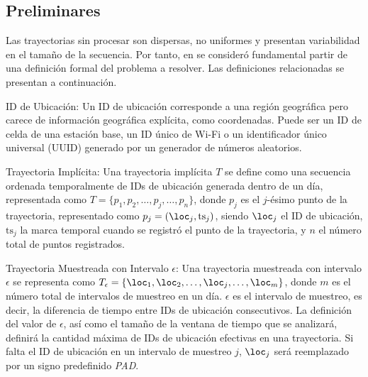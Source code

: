 \subsection{Preliminares}

Las trayectorias sin procesar son dispersas, no uniformes y presentan variabilidad en el tamaño de la secuencia. Por tanto, en \cite{si2023trajbert} se consideró fundamental partir de una definición formal del problema a resolver. Las definiciones relacionadas se presentan a continuación.

\begin{definition}{ID de Ubicación:}
    Un ID de ubicación corresponde a una región geográfica pero carece de información geográfica explícita, como coordenadas. Puede ser un ID de celda de una estación base, un ID único de Wi-Fi o un identificador único universal (UUID) generado por un generador de números aleatorios.
\end{definition}

\begin{definition}{Trayectoria Implícita:}
    Una trayectoria implícita $T$ se define como una secuencia ordenada temporalmente de IDs de ubicación generada dentro de un día, representada como $T = \{p_1, p_2, \ldots, p_j, \ldots, p_n\}$, donde $p_j$ es el $j$-ésimo punto de la trayectoria, representado como $p_j = (\loc_j, \text{ts}_j)$, siendo $\loc_j$ el ID de ubicación, $\text{ts}_j$ la marca temporal cuando se registró el punto de la trayectoria, y $n$ el número total de puntos registrados.
\end{definition}

\begin{definition}{Trayectoria Muestreada con Intervalo $\epsilon$:}
    Una trayectoria muestreada con intervalo $\epsilon$ se representa como $T_\epsilon = \{\loc_1, \loc_2, \ldots, \loc_j, \ldots, \loc_m\}$, donde $m$ es el número total de intervalos de muestreo en un día. $\epsilon$ es el intervalo de muestreo, es decir, la diferencia de tiempo entre IDs de ubicación consecutivos. La definición del valor de $\epsilon$, así como el tamaño de la ventana de tiempo que se analizará, definirá la cantidad máxima de IDs de ubicación efectivas en una trayectoria. Si falta el ID de ubicación en un intervalo de muestreo $j$, $\loc_j$ será reemplazado por un signo predefinido \emph{PAD}.
    \label{def:e_sampling}
\end{definition}


